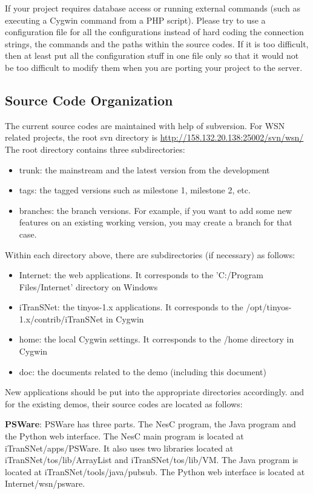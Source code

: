 If your project requires database access or running external commands (such as executing a Cygwin command from a PHP script). Please try to use a configuration file for all the configurations instead of hard coding the connection strings, the commands and the paths within the source codes. If it is too difficult, then at least put all the configuration stuff in one file only so that it would not be too difficult to modify them when you are porting your project to the server.

\subsection{Source Code Organization}
\label{sec:source}
The current source codes are maintained with help of subversion. For WSN related projects, the root svn directory is \url{http://158.132.20.138:25002/svn/wsn/} The root directory contains three subdirectories:
\begin{itemize}
\item trunk: the mainstream and the latest version from the development
\item tags: the tagged versions such as milestone 1, milestone 2, etc.
\item branches: the branch versions. For example, if you want to add some new features on an existing working version, you may create a branch for that case.
\end{itemize}

Within each directory above, there are subdirectories (if necessary) as follows:
\begin{itemize}
\item Internet: the web applications. It corresponds to the 'C:/Program Files/Internet' directory on Windows
\item iTranSNet: the tinyos-1.x applications. It corresponds to the /opt/tinyos-1.x/contrib/iTranSNet in Cygwin
\item home: the local Cygwin settings. It corresponds to the /home directory in Cygwin
\item doc: the documents related to the demo (including this document)
\end{itemize}

New applications should be put into the appropriate directories accordingly. and for the existing demos, their source codes are located as follows:

\textbf{PSWare}: PSWare has three parts. The NesC program, the Java program and the Python web interface. The NesC main program is located at iTranSNet/apps/PSWare. It also uses two libraries located at iTranSNet/tos/lib/ArrayList and iTranSNet/tos/lib/VM. The Java program is located at iTranSNet/tools/java/pubsub. The Python web interface is located at Internet/wsn/psware.

